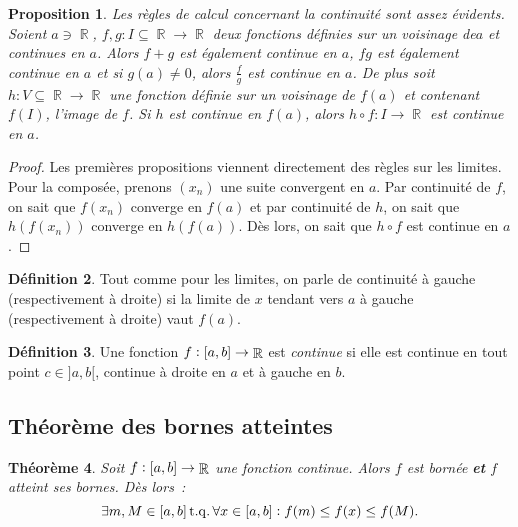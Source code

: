 \documentclass{article}
\DeclareMathOperator{\R}{\mathbb R}
\DeclareMathOperator{\tq}{ t.q. }
\newcommand{\ab}{\interval ab}
\newcommand{\fabr}[1]{#1 : \ab \to \R}
\newtheorem{thm}{Théorème}[section]
\newtheorem{prp}[thm]{Proposition}
\theoremstyle{definition}
\newtheorem{déf}[thm]{Définition}
\theoremstyle{remark}
\begin{document}
		\begin{prp} Les règles de calcul concernant la continuité sont assez évidents. Soient $a \ni \R$, $f, g : I \subseteq \R \to \R$ deux fonctions
		définies sur un voisinage de$a$ et continues en $a$. Alors $f+g$ est également continue en $a$, $fg$ est également continue en $a$ et si
		$g(a) \neq 0$, alors $\frac fg$ est continue en $a$. De plus soit $h : V \subseteq \R \to \R$ une fonction définie sur un voisinage de $f(a)$
		et contenant $f(I)$, l'image de $f$. Si $h$ est continue en $f(a)$, alors $h \circ f : I \to \R$ est continue en $a$. \end{prp}

		\begin{proof} Les premières propositions viennent directement des règles sur les limites. Pour la composée, prenons $(x_n)$ une suite convergent en $a$.
		Par continuité de $f$, on sait que $f(x_n)$ converge en $f(a)$ et par continuité de $h$, on sait que $h(f(x_n))$ converge en $h(f(a))$. Dès lors, on sait que
		$h \circ f$ est continue en $a$. \end{proof}

		\begin{déf} Tout comme pour les limites, on parle de continuité à gauche (respectivement à droite) si la limite de $x$ tendant vers $a$ à gauche
		(respectivement à droite) vaut $f(a)$. \end{déf}

		\begin{déf} Une fonction $\fabr f$ est \textit{continue} si elle est continue en tout point $c \in ]a, b[$, continue à droite en
		$a$ et à gauche en $b$. \end{déf}
	
	\subsection{Théorème des bornes atteintes}

		\begin{thm} Soit $\fabr f$ une fonction continue. Alors $f$ est bornée \textbf{et} $f$ atteint ses bornes. Dès lors~:
		\[\exists m, M \in \ab \tq \forall x \in \ab : f(m) \leq f(x) \leq f(M).\]
		\end{thm}
\end{document}
